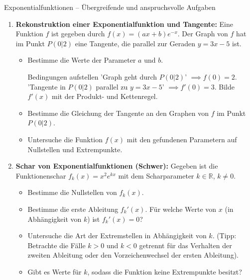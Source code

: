 \begin{aufgabenumgebung}{Exponentialfunktionen – Übergreifende und anspruchsvolle Aufgaben}
\begin{enumerate}
    \item \textbf{Rekonstruktion einer Exponentialfunktion und Tangente:}
        Eine Funktion $f$ ist gegeben durch $f(x) = (ax+b)e^{-x}$. Der Graph von $f$ hat im Punkt $P(0|2)$ eine Tangente, die parallel zur Geraden $y=3x-5$ ist.
        \begin{itemize}
            \item Bestimme die Werte der Parameter $a$ und $b$.
            \begin{tippumgebung}{Bedingungen aufstellen}
            'Graph geht durch $P(0|2)$' $\implies f(0)=2$.
            'Tangente in $P(0|2)$ parallel zu $y=3x-5$' $\implies f'(0) = 3$.
            Bilde $f'(x)$ mit der Produkt- und Kettenregel.
            \end{tippumgebung}
            \item Bestimme die Gleichung der Tangente an den Graphen von $f$ im Punkt $P(0|2)$.
            \item Untersuche die Funktion $f(x)$ mit den gefundenen Parametern auf Nullstellen und Extrempunkte.
        \end{itemize}

    \item \textbf{Schar von Exponentialfunktionen (Schwer):}
        Gegeben ist die Funktionenschar $f_k(x) = x^2 e^{kx}$ mit dem Scharparameter $k \in \mathbb{R}$, $k \neq 0$.
        \begin{itemize}
            \item Bestimme die Nullstellen von $f_k(x)$.
            \item Bestimme die erste Ableitung $f_k'(x)$. Für welche Werte von $x$ (in Abhängigkeit von $k$) ist $f_k'(x)=0$?
            \item Untersuche die Art der Extremstellen in Abhängigkeit von $k$. (Tipp: Betrachte die Fälle $k>0$ und $k<0$ getrennt für das Verhalten der zweiten Ableitung oder den Vorzeichenwechsel der ersten Ableitung).
            \item Gibt es Werte für $k$, sodass die Funktion keine Extrempunkte besitzt?
        \end{itemize}
\end{enumerate}
\end{aufgabenumgebung}


